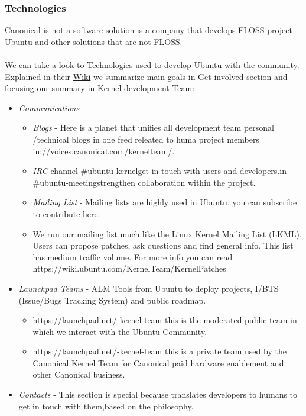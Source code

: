\subsubsection{ Technologies} Canonical is not a software solution is a company that develops FLOSS project Ubuntu and other solutions that are not FLOSS.
\\
\\ We can take a look to Technologies used to develop Ubuntu with the community. Explained in their \href{https://wiki.ubuntu.com/}{Wiki} we summarize main goals in Get involved section and focusing our summary in Kernel development Team:
\\
\begin{itemize}
	\item \textit{Communications}
\begin{itemize}
	\item \textit{Blogs} - Here is a planet that unifies all development team personal /technical blogs in one feed releated to huma project members in\nolinebreakhttp://voices.canonical.com/kernelteam/.
	\item \textit{IRC} channel \#ubuntu-kernel\nolinebreakto get in touch with users and developers.\nolinebreakWeekly\nolinebreakIRC\nolinebreak\nolinebreakpublic\nolinebreakmeeting in \#ubuntu-meeting\nolinebreakto strengthen collaboration within the project.
	\item \textit{Mailing List} - Mailing lists are highly used in Ubuntu, you can subscribe to contribute \href{https://lists.ubuntu.com/mailman/listinfo/kernel-team}{here}.
	\item We run our mailing list much like the Linux Kernel Mailing List (LKML). Users can propose patches, ask questions and find general info. This list has medium traffic volume. For more info you can read https://wiki.ubuntu.com/KernelTeam/KernelPatches
\end{itemize}
	\item \textit{Launchpad Teams} - ALM Tools from Ubuntu to deploy projects, I/BTS (Issue/Bugs Tracking System) and public roadmap.
\begin{itemize}
	\item https://launchpad.net/\textasciitildeubuntu-kernel-team this is the moderated public team in which we interact with the Ubuntu Community.
	\item https://launchpad.net/\textasciitildecanonical-kernel-team this is a private team used by the Canonical Kernel Team for Canonical paid hardware enablement and other Canonical business.
\end{itemize}
	\item \textit{Contacts} - This section is special because translates developers to humans to get in touch with them,\nolinebreakis based on the philosophy.
\end{itemize}

